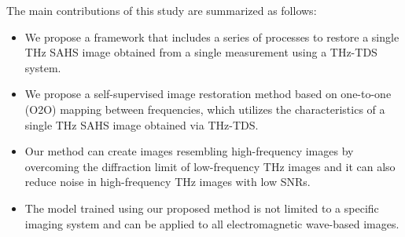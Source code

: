 The main contributions of this study are summarized as follows:
\begin{itemize}
\item We propose a framework that includes a series of processes to restore a single THz SAHS image obtained from a single measurement using a THz-TDS system.
\item We propose a self-supervised image restoration method based on one-to-one (O2O) mapping between frequencies, which utilizes the characteristics of a single THz SAHS image obtained via THz-TDS.
\item Our method can create images resembling high-frequency images by overcoming the diffraction limit of  low-frequency THz images and it can also reduce noise in high-frequency THz images with low SNRs.
\item The model trained using our proposed method is not limited to a specific imaging system and can be applied to all electromagnetic wave-based images.
\end{itemize}